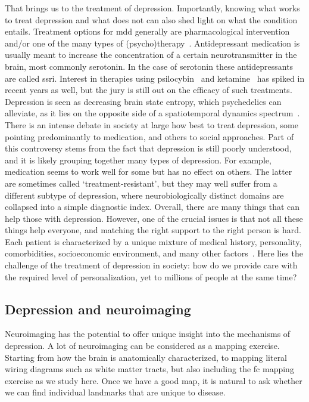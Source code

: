 That brings us to the treatment of depression.
Importantly, knowing what works to treat depression and what does not can also shed light on what the condition entails.
Treatment options for \gls{mdd} generally are pharmacological intervention and/or one of the many types of (psycho)therapy~\parencite{Otte2016}.
Antidepressant medication is usually meant to increase the concentration of a certain neurotransmitter in the brain, most commonly serotonin.
In the case of serotonin these antidepressants are called \gls{ssri}.
Interest in therapies using psilocybin~\parencite{Carhart-Harris2016, Luppi2021, Daws2022, Singleton2022} and ketamine~\parencite{Krystal2019, Kotoula2021} has spiked in recent years as well, but the jury is still out on the efficacy of such treatments.
Depression is seen as decreasing brain state entropy, which psychedelics can alleviate, as it lies on the opposite side of a spatiotemporal dynamics spectrum~\parencite{Vohryzek2022}.
%
There is an intense debate in society at large how best to treat depression, some pointing predominantly to medication, and others to social approaches.
Part of this controversy stems from the fact that depression is still poorly understood, and it is likely grouping together many types of depression.
For example, medication seems to work well for some but has no effect on others.
The latter are sometimes called `treatment-resistant', but they may well suffer from a different subtype of depression, where neurobiologically distinct domains are collapsed into a simple diagnostic index.
Overall, there are many things that can help those with depression.
However, one of the crucial issues is that not all these things help everyone, and matching the right support to the right person is hard.
Each patient is characterized by a unique mixture of medical history, personality, comorbidities, socioeconomic environment, and many other factors~\parencite{Trivedi2006}.
Here lies the challenge of the treatment of depression in society: how do we provide care with the required level of personalization, yet to millions of people at the same time?

\subsection{Depression and neuroimaging}\label{subsec:fc-neuroimaging}

Neuroimaging has the potential to offer unique insight into the mechanisms of depression.
A lot of neuroimaging can be considered as a mapping exercise.
Starting from how the brain is anatomically characterized, to mapping literal wiring diagrams such as white matter tracts, but also including the \gls{fc} mapping exercise as we study here.
Once we have a good map, it is natural to ask whether we can find individual landmarks that are unique to disease.

